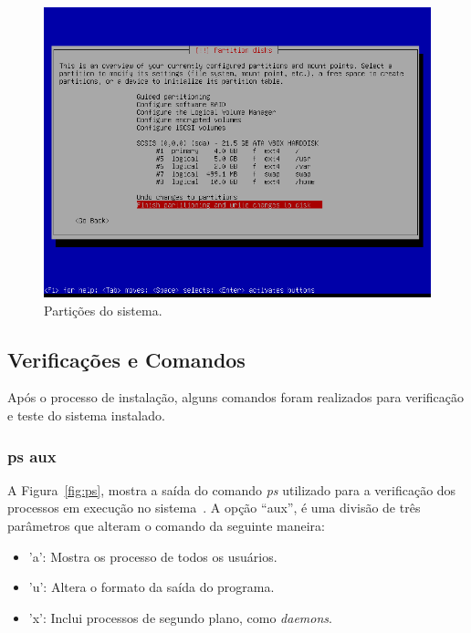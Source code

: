 \documentclass[
	12pt,				%
	oneside,   	        %
	a4paper,			%
	english,			%
	french,				%
	spanish,			%
	brazil,				%
	]{pacotes/abntex2}
\begin{document}
\begin{figure}[H]
  \centering
  \includegraphics[scale=0.7]{figuras/partition.png}
  \caption{Partições do sistema.}
  \label{fig:partition}
\end{figure}

\subsection{Verificações e Comandos}
\label{subsec:verificacao}

Após o processo de instalação, alguns comandos foram realizados para verificação e teste do sistema instalado.

\subsubsection{ps aux}
A Figura~\ref{fig:ps}, mostra a saída do comando \textit{ps} utilizado para a verificação dos processos em execução no sistema~\cite{manPs}. A opção ``aux'', é uma divisão de três parâmetros que alteram o comando da seguinte maneira:

\begin{itemize}
    \item 'a': Mostra os processo de todos os usuários.
    
    \item 'u': Altera o formato da saída do programa.
    
    \item 'x': Inclui processos de segundo plano, como \textit{daemons}.
\end{itemize}
\end{document}
